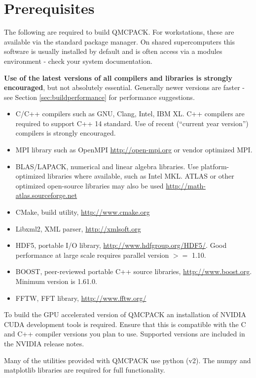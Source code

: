 \section{Prerequisites}
\label{sec:prerequisites}
The following are required to build QMCPACK. For workstations, these are available via the standard
package manager. On shared supercomputers this software is usually
installed by default and is often
access via a modules environment - check your system
documentation.

\textbf{Use of the latest versions of all compilers and libraries is
strongly encouraged}, but not absolutely essential. Generally newer versions are faster - see
Section \ref{sec:buildperformance} for performance suggestions.

\begin{itemize}
\item C/C++ compilers such as GNU, Clang, Intel, IBM XL. C++ compilers
  are required to support C++ 14 standard. Use of recent (``current
  year version'') compilers is strongly encouraged.
\item MPI library such as OpenMPI \url{http://open-mpi.org} or vendor
  optimized MPI.
\item BLAS/LAPACK, numerical and linear algebra libraries. Use
  platform-optimized libraries where available, such as Intel MKL.
  ATLAS or other optimized open-source libraries may also be used
  \url{http://math-atlas.sourceforge.net}
\item CMake, build utility, \url{http://www.cmake.org}
\item Libxml2, XML parser, \url{http://xmlsoft.org}
\item HDF5, portable I/O library, \url{http://www.hdfgroup.org/HDF5/}. Good performance at large scale requires parallel version $>=$ 1.10.
\item BOOST, peer-reviewed portable C++ source libraries, \url{http://www.boost.org}.   Minimum version is 1.61.0.
\item FFTW, FFT library, \url{http://www.fftw.org/}
\end{itemize}

To build the GPU accelerated version of QMCPACK an installation of
NVIDIA CUDA development tools is required. Ensure that this is
compatible with the C and C++ compiler versions you plan to
use. Supported versions are included in the NVIDIA release notes.

Many of the utilities provided with QMCPACK use python (v2). The numpy
and matplotlib libraries are required for full functionality.

